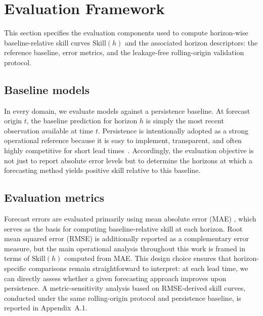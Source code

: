 \documentclass[pdflatex,sn-mathphys]{sn-jnl}
\begin{document}
\section{Evaluation Framework}\label{sec:framework}
This section specifies the evaluation components used to compute horizon-wise baseline-relative skill curves $\mathrm{Skill}(h)$ and the associated horizon descriptors: the reference baseline, error metrics, and the leakage-free rolling-origin validation protocol.
\subsection{Baseline models}
In every domain, we evaluate models against a persistence baseline. At forecast origin $t$, the baseline prediction for horizon $h$ is simply the most recent observation available at time $t$. Persistence is intentionally adopted as a strong operational reference because it is easy to implement, transparent, and often highly competitive for short lead times~\citep{murphy1993,hyndman2018}. Accordingly, the evaluation objective is not just to report absolute error levels but to determine the horizons at which a forecasting method yields positive skill relative to this baseline.
\subsection{Evaluation metrics}
Forecast errors are evaluated primarily using mean absolute error (MAE) \citep{hyndman2006}, which serves as the basis for computing baseline-relative skill at each horizon. Root mean squared error (RMSE) is additionally reported as a complementary error measure, but the main operational analysis throughout this work is framed in terms of $\mathrm{Skill}(h)$ computed from MAE. This design choice ensures that horizon-specific comparisons remain straightforward to interpret: at each lead time, we can directly assess whether a given forecasting approach improves upon persistence. A metric-sensitivity analysis based on RMSE-derived skill curves, conducted under the same rolling-origin protocol and persistence baseline, is reported in Appendix~A.1.
\end{document}

